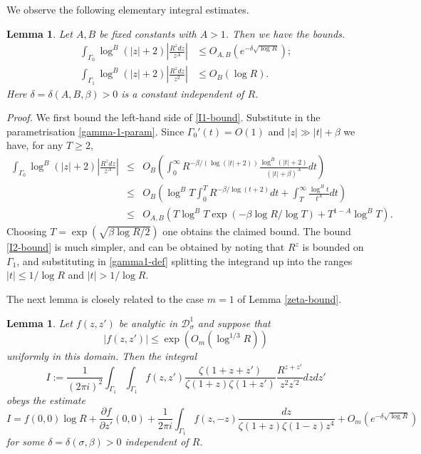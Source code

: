 \documentclass[12pt,a4paper,reqno]{amsart}
\numberwithin{equation}{section}
\theoremstyle{plain}
\newtheorem{lemma}[subsection]{Lemma}
\theoremstyle{definition}
\renewcommand{\leq}{\leqslant}
\renewcommand{\geq}{\geqslant}
\def\ni{\noindent}
\def\proof{\noindent\textit{Proof. }}
\def\endproof{\hfill{\usebox{\proofbox}}}
\begin{document}
\ni We observe the following elementary integral estimates.

\begin{lemma}\label{preliminary-bounds-1} Let $A,B$ be fixed constants with $A > 1$. Then we have the bounds.
\begin{align}
\int_{\Gamma_0} \log^B(|z| + 2)\left| \frac{R^zdz}{z^A}\right| &\leq O_{A,B}(e^{-\delta \sqrt{\log R}});
\label{I1-bound}\\
\int_{\Gamma_1} \log^B(|z| + 2)\left| \frac{R^zdz}{z^2}\right| &\leq O_B(\log R).\label{I2-bound}
\end{align}
Here $\delta = \delta(A,B,\beta) > 0$ is a constant independent of $R$.
\end{lemma}
\proof We first bound the left-hand side of \eqref{I1-bound}.  Substitute in the parametrisation \eqref{gamma-1-param}. Since $\Gamma_0'(t) = O(1)$ and $|z| \gg |t| + \beta$ we have, for any $T \geq 2$,
\begin{eqnarray*} 
\int_{\Gamma_0} \log^B(|z| + 2)\left| \frac{R^zdz}{z^A}\right| & 
\leq & O_B(\int^{\infty}_0 R^{-\beta/(\log(|t| + 2))} \frac{\log^B(|t| + 2)}{(|t| + \beta)^A} dt) \\ & \leq & O_B( \log^BT \int^T_0  R^{-\beta/\log(t+2)} dt + \int^{\infty}_T \frac{\log^Bt}{t^A} dt) \\ & \leq & O_{A,B}(T\log^BT\exp(-\beta \log R/\log T) + T^{1-A}\log^BT).\end{eqnarray*}
Choosing $T = \exp(\sqrt{\beta \log R/2})$ one obtains the claimed bound.
The bound \eqref{I2-bound} is much simpler, and can be obtained by noting that $R^z$ is bounded on $\Gamma_1$,
and substituting in \eqref{gamma1-def} splitting the integrand up into the ranges $|t| \leq 1/\log R$ and $|t| > 1/\log R$.\endproof\vspace{11pt}

\ni The next lemma is closely related to the case $m = 1$ of Lemma \ref{zeta-bound}.

\begin{lemma}\label{preliminary-bounds-2}
Let $f(z,z')$ be analytic in $\mathcal{D}_{\sigma}^1$ and suppose that \[|f(z,z')| \leq \exp(O_m(\log^{1/3}R))\] uniformly in this domain. Then the integral
\[ I := \frac{1}{(2\pi i)^2} \int_{\Gamma_1}\int_{\Gamma_1} f(z,z') \frac{\zeta(1 + z + z')}{\zeta(1 + z)\zeta(1 + z')} \frac{R^{z + z'}}{z^2 z^{\prime 2}} dz dz'  \]
obeys the estimate
$$ I = f(0,0)\log R + 
\frac{\partial f}{\partial z'}(0,0) + \frac{1}{2\pi i} \int_{\Gamma_1} f(z,-z) \frac{dz}{\zeta(1 + z)\zeta(1 - z)z^4}
+ O_{m}(e^{-\delta \sqrt{\log R}})$$
for some $\delta = \delta(\sigma,\beta) > 0$ independent of $R$.
\end{lemma}
\end{document}
